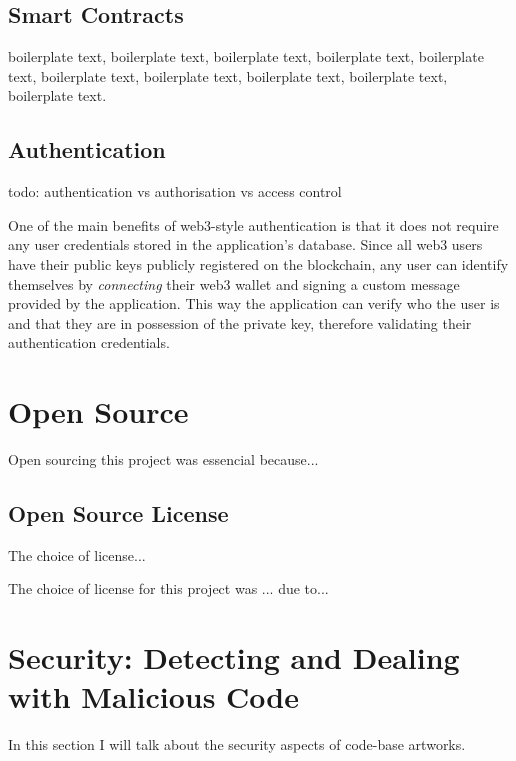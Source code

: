 \subsection{Smart Contracts}

boilerplate text, boilerplate text, boilerplate text, boilerplate text, boilerplate text, boilerplate text, boilerplate text, boilerplate text, boilerplate text, boilerplate text.

\subsection{Authentication}

todo: authentication vs authorisation vs access control

One of the main benefits of web3-style authentication is that it does not require any user credentials stored in the application's database. Since all web3 users have their public keys publicly registered on the blockchain, any user can identify themselves by \emph{connecting} their web3 wallet and signing a custom message provided by the application. This way the application can verify who the user is and that they are in possession of the private key, therefore validating their authentication credentials.

\section{Open Source}

Open sourcing this project was essencial because...

\subsection{Open Source License}

The choice of license...


The choice of license for this project was ... due to...



\section{Security: Detecting and Dealing with Malicious Code}

In this section I will talk about the security aspects of code-base artworks.